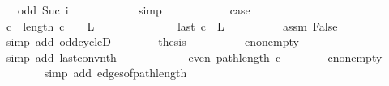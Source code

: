 \begin{isabellebody}
\ {\isachardoublequoteopen}{\isachardot}{\kern0pt}{\isachardot}{\kern0pt}{\isachardot}{\kern0pt}\ {\isasymlongleftrightarrow}\ odd\ {\isacharparenleft}{\kern0pt}Suc\ i{\isacharparenright}{\kern0pt}{\isachardoublequoteclose}\isanewline
\ \ \ \ \ \ \ \ \ \ \isamarkupfalse%
\ simp\isanewline
\ \ \ \ \ \ \ \ \isamarkupfalse%
\ \isamarkupfalse%
\ {\isacharquery}{\kern0pt}case\isanewline
\ \ \ \ \ \ \ \ \ \ \isacommand{{\isachardot}{\kern0pt}}\isamarkupfalse%
\isanewline
\ \ \ \ \ \ \isamarkupfalse%
\ \isacommand{{\isacharbraceright}{\kern0pt}}\isamarkupfalse%
\isanewline
\ \ \ \ \isamarkupfalse%
\ \isamarkupfalse%
\ {\isachardoublequoteopen}c\ {\isacharbang}{\kern0pt}\ {\isacharparenleft}{\kern0pt}length\ c\ {\isacharminus}{\kern0pt}\ {}{\isacharparenright}{\kern0pt}\ {\isasymnotin}\ L{\isachardoublequoteclose}\isanewline
\ \ \ \ \isamarkupfalse%
\ {\isacharminus}{\kern0pt}\isanewline
\ \ \ \ \ \ \isamarkupfalse%
\ {\isachardoublequoteopen}last\ c\ {\isasymnotin}\ L{\isachardoublequoteclose}\isanewline
\ \ \ \ \ \ \ \ \isamarkupfalse%
\ assm\ False\isanewline
\ \ \ \ \ \ \ \ \isamarkupfalse%
\ {\isacharparenleft}{\kern0pt}simp\ add{\isacharcolon}{\kern0pt}\ odd{\isacharunderscore}{\kern0pt}cycleD{\isacharparenleft}{\kern0pt}{}{\isacharparenright}{\kern0pt}{\isacharparenright}{\kern0pt}\isanewline
\ \ \ \ \ \ \isamarkupfalse%
\ {\isacharquery}{\kern0pt}thesis\isanewline
\ \ \ \ \ \ \ \ \isamarkupfalse%
\ c{\isacharunderscore}{\kern0pt}non{\isacharunderscore}{\kern0pt}empty\isanewline
\ \ \ \ \ \ \ \ \isamarkupfalse%
\ {\isacharparenleft}{\kern0pt}simp\ add{\isacharcolon}{\kern0pt}\ last{\isacharunderscore}{\kern0pt}conv{\isacharunderscore}{\kern0pt}nth{\isacharparenright}{\kern0pt}\isanewline
\ \ \ \ \isamarkupfalse%
\isanewline
\ \ \ \ \isamarkupfalse%
\ \isamarkupfalse%
\ {\isachardoublequoteopen}even\ {\isacharparenleft}{\kern0pt}path{\isacharunderscore}{\kern0pt}length\ c{\isacharparenright}{\kern0pt}{\isachardoublequoteclose}\isanewline
\ \ \ \ \ \ \isamarkupfalse%
\ c{\isacharunderscore}{\kern0pt}non{\isacharunderscore}{\kern0pt}empty\isanewline
\ \ \ \ \ \ \isamarkupfalse%
\ {\isacharparenleft}{\kern0pt}simp\ add{\isacharcolon}{\kern0pt}\ edges{\isacharunderscore}{\kern0pt}of{\isacharunderscore}{\kern0pt}path{\isacharunderscore}{\kern0pt}length{\isacharparenright}{\kern0pt}\isanewline

\end{isabellebody}

